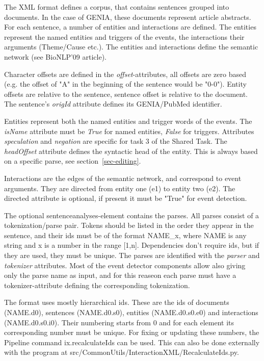 \documentclass[a4paper,12pt]{article}
\begin{document}
The XML format defines a corpus, that contains sentences grouped into documents.
In the case of GENIA, these documents represent article abstracts. For each
sentence, a number of entities and interactions are defined. The entities
represent the named entities and triggers of the events, the interactions their
arguments (Theme/Cause etc.). The entities and interactions define the semantic
network (see BioNLP'09 article).

Character offsets are defined in the \emph{offset}-attributes, all offsets are
zero based (e.g. the offset of "A" in the beginning of the sentence would be "0-0").
Entity offsets are relative to the sentence, sentence offset is relative to the
document. The sentence's \emph{origId} attribute defines its GENIA/PubMed
identifier.

Entities represent both the named entities and trigger words of the events. The
\emph{isName} attribute must be \emph{True} for named entities, \emph{False} for triggers.
Attributes \emph{speculation} and \emph{negation} are specific for task 3 of the Shared
Task. The \emph{headOffset} attribute defines the syntactic head of the entity. This
is always based on a specific parse, see section~\ref{sec-editing}.

Interactions are the edges of the semantic network, and correspond to event
arguments. They are directed from entity one (e1) to entity two (e2). The
directed attribute is optional, if present it must be "True" for event detection.

The optional sentenceanalyses-element contains the parses. All parses consist of
a tokenization/parse pair. Tokens should be listed in the order they appear in
the sentence, and their ids must be of the format NAME\_x, where NAME is any
string and x is a number in the range [1,n]. Dependencies don't require ids, but
if they are used, they must be unique. The parses are identified with the
\emph{parser} and \emph{tokenizer} attributes. Most of the event detector components
allow also giving only the parse name as input, and for this reaseon each parse must
have a tokenizer-attribute defining the corresponding tokenization.

The format uses mostly hierarchical ids. These are the ids of documents
(NAME.d0), sentences (NAME.d0.s0), entities (NAME.d0.s0.e0) and interactions
(NAME.d0.s0.i0). Their numbering starts from 0 and for each element its
corresponding number must be unique. For fixing or updating these numbers, the
Pipeline command ix.recalculateIds can be used. This can also be done
externally with the program at src/CommonUtils/InteractionXML/RecalculateIds.py.
\end{document}
